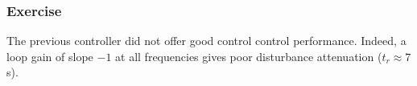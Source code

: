 \subsubsection{Exercise}

The previous controller did not offer good control control performance.
Indeed, a loop gain of slope $-1$ at all frequencies gives poor disturbance attenuation ($t_r \approx 7$s). 

